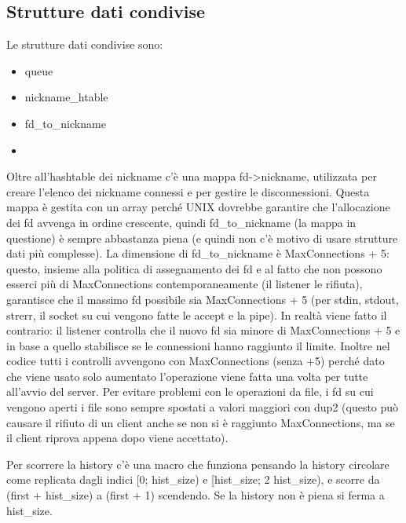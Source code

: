 \documentclass[a4paper]{article}
\theoremstyle{theorem}
\theoremstyle{remark}
\theoremstyle{definition}
\theoremstyle{corollary}
\theoremstyle{lemma}
\begin{document}
\subsection{Strutture dati condivise}
Le strutture dati condivise sono:
\begin{itemize}
	\item queue
	\item nickname\_htable
	\item fd\_to\_nickname
	\item 
\end{itemize}
Oltre all'hashtable dei nickname c'è una mappa fd->nickname, utilizzata per
creare l'elenco dei nickname connessi e per gestire le disconnessioni. Questa
mappa è gestita con un array perché UNIX dovrebbe garantire che l'allocazione
dei fd avvenga in ordine crescente, quindi fd\_to\_nickname (la mappa in questione)
è sempre abbastanza piena (e quindi non c'è motivo di usare strutture dati più
complesse). La dimensione di fd\_to\_nickname è MaxConnections + 5: questo,
insieme alla politica di assegnamento dei fd e al fatto che non possono esserci
più di MaxConnections contemporaneamente (il listener le rifiuta), garantisce
che il massimo fd possibile sia MaxConnections + 5 (per stdin, stdout, strerr,
il socket su cui vengono fatte le accept e la pipe). In realtà viene fatto il
contrario: il listener controlla che il nuovo fd sia minore di MaxConnections + 5
e in base a quello stabilisce se le connessioni hanno raggiunto il limite.
Inoltre nel codice tutti i controlli avvengono con MaxConnections (senza +5)
perché dato che viene usato solo aumentato l'operazione viene fatta una volta
per tutte all'avvio del server. Per evitare problemi con le operazioni da file,
i fd su cui vengono aperti i file sono sempre spostati a valori maggiori con
dup2 (questo può causare il rifiuto di un client anche se non si è raggiunto
MaxConnections, ma se il client riprova appena dopo viene accettato).

Per scorrere la history c'è una macro che funziona pensando la history
circolare come replicata dagli indici [0; hist\_size) e [hist\_size; 2 hist\_size),
e scorre da (first + hist\_size) a (first + 1) scendendo. Se la history non
è piena si ferma a hist\_size.
\end{document}
